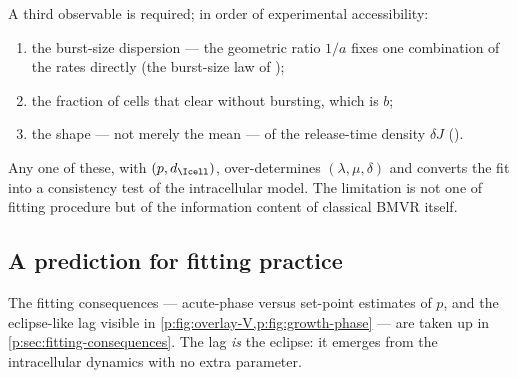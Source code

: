 A third observable is required; in order of experimental accessibility:
\begin{enumerate}
\item the burst-size dispersion --- the geometric ratio $1/a$ fixes one
combination of the rates directly (the burst-size law of \ChDist{});
\item the fraction of cells that clear without bursting, which is $b$;
\item the shape --- not merely the mean --- of the release-time density
$\delta J$ (\ChDist{}).
\end{enumerate}
Any one of these, with $(p,d_{\Icell})$, over-determines
$(\lambda,\mu,\delta)$ and converts the fit into a consistency test of the
intracellular model. The limitation is not one of fitting procedure but of
the information content of classical BMVR itself.

\subsection{A prediction for fitting practice}

The fitting consequences --- acute-phase versus set-point estimates of $p$,
and the eclipse-like lag visible in
\cref{p:fig:overlay-V,p:fig:growth-phase} --- are taken up in
\cref{p:sec:fitting-consequences}. The lag \emph{is} the eclipse: it
emerges from the intracellular dynamics with no extra parameter.

\FloatBarrier
